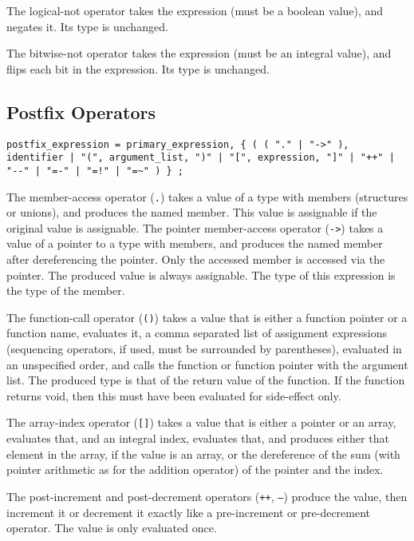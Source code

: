 \documentclass[letterpaper,12pt]{book}
\begin{document}
The logical-not operator takes the expression (must be a boolean value), and negates it. Its type is unchanged.

The bitwise-not operator takes the expression (must be an integral value), and flips each bit in the expression. Its type is unchanged.

\subsection{Postfix Operators}

\begin{lstlisting}[breaklines=true]
postfix_expression = primary_expression, { ( ( "." | "->" ), identifier | "(", argument_list, ")" | "[", expression, "]" | "++" | "--" | "=-" | "=!" | "=~" ) } ;
\end{lstlisting}

The member-access operator (\texttt{.}) takes a value of a type with members (structures or unions), and produces the named member. This value is assignable if the original value is assignable. The pointer member-access operator (\texttt{->}) takes a value of a pointer to a type with members, and produces the named member after dereferencing the pointer. Only the accessed member is accessed via the pointer. The produced value is always assignable. The type of this expression is the type of the member.

The function-call operator (\texttt{()}) takes a value that is either a function pointer or a function name, evaluates it, a comma separated list of assignment expressions (sequencing operators, if used, must be surrounded by parentheses), evaluated in an unspecified order, and calls the function or function pointer with the argument list. The produced type is that of the return value of the function. If the function returns void, then this must have been evaluated for side-effect only.

The array-index operator (\texttt{[]}) takes a value that is either a pointer or an array, evaluates that, and an integral index, evaluates that, and produces either that element in the array, if the value is an array, or the dereference of the sum (with pointer arithmetic as for the addition operator) of the pointer and the index.

The post-increment and post-decrement operators (\texttt{++}, \texttt{--}) produce the value, then increment it or decrement it exactly like a pre-increment or pre-decrement operator. The value is only evaluated once.
\end{document}
